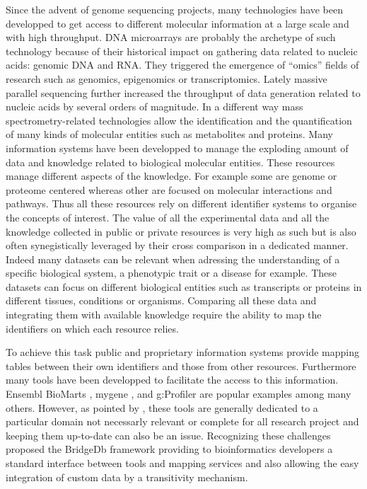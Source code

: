 \documentclass[9pt,a4paper,]{extarticle}
\theoremstyle{definition}
\theoremstyle{definition}
\theoremstyle{definition}
\theoremstyle{remark}
\begin{document}
Since the advent of genome sequencing projects, many technologies have been
developped to get access to different molecular information at a large scale
and with high throughput. DNA microarrays are probably the archetype of such
technology because of their historical impact on gathering data related
to nucleic acids: genomic DNA and RNA. They triggered the emergence of
``omics'' fields of research such as genomics, epigenomics or transcriptomics.
Lately massive parallel sequencing
further increased the throughput of data generation related to nucleic acids
by several orders of magnitude.
In a different way mass spectrometry-related technologies allow the
identification and the quantification of many kinds of molecular entities
such as metabolites and proteins.
Many information systems have been developped to manage
the exploding amount of data and knowledge related to biological
molecular entities.
These resources manage different aspects of
the knowledge.
For example some are genome or proteome centered whereas other
are focused on molecular interactions and pathways.
Thus all these resources rely on different identifier systems to organise
the concepts of interest.
The value of all the experimental data and all the knowledge
collected in public or private resources is very high as such
but is also often synegistically leveraged by their cross comparison
in a dedicated manner. Indeed many datasets can be relevant when
adressing the understanding of a specific biological system, a phenotypic trait
or a disease for example. These datasets can focus on different biological
entities such as transcripts or proteins in different tissues, conditions
or organisms. Comparing all these data and integrating them with
available knowledge require the ability to map the identifiers on which
each resource relies.

To achieve this task public and proprietary information systems
provide mapping tables between their own identifiers and those
from other resources.
Furthermore many tools have been developped to facilitate the access
to this information.
Ensembl BioMarts \citep{kinsella_ensembl_2011},
mygene \citep{wu_biogps_2013},
and g:Profiler \citep{reimand_g:profiler-web_2016}
are popular examples among many others.
However, as pointed by \citet{van_iersel_bridgedb_2010}, these tools
are generally dedicated to a particular domain not necessarly
relevant or complete for all research project and keeping them
up-to-date can also be an issue.
Recognizing these challenges \citet{van_iersel_bridgedb_2010} proposed
the BridgeDb framework providing to bioinformatics developers
a standard interface between tools and
mapping services and also allowing the easy integration of custom data
by a transitivity mechanism.
\end{document}
